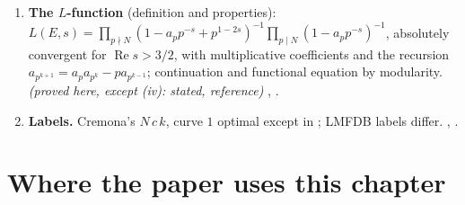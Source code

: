 \begin{enumerate}[label=\textbf{\thechapter.\arabic*}]
\item \textbf{The $L$-function} (definition and properties): $L(E,s)=\prod_{p\nmid N}(1-a_pp^{-s}+p^{1-2s})^{-1}\prod_{p\mid N}(1-a_pp^{-s})^{-1}$, absolutely convergent for $\operatorname{Re}s>3/2$, with multiplicative coefficients
and the recursion $a_{p^{k+1}}=a_pa_{p^k}-pa_{p^{k-1}}$; continuation and functional equation by modularity. \emph{(proved here, except (iv): stated, reference)} ,
.
\item \textbf{Labels.} Cremona's $N\,c\,k$, curve $1$ optimal except in ; LMFDB labels differ. , .
\end{enumerate}

\section*{Where the paper uses this chapter}

